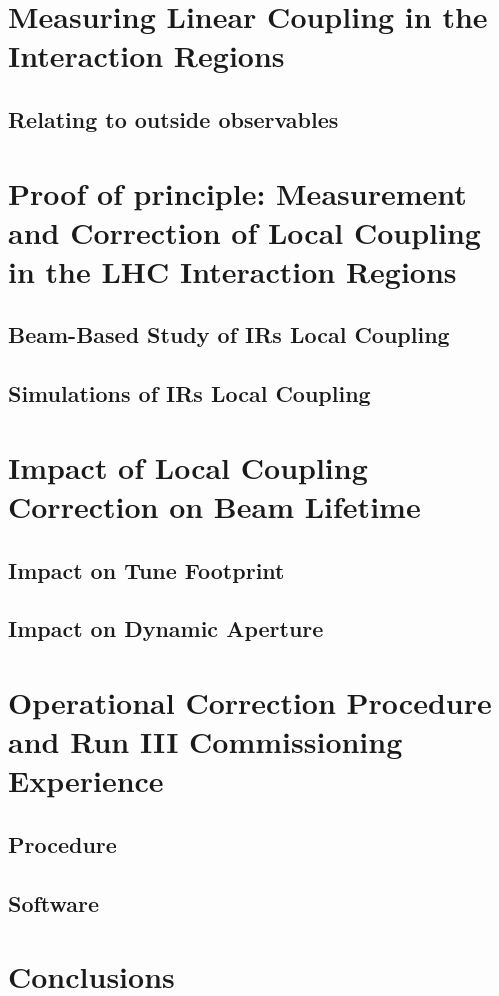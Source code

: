 \section{Measuring Linear Coupling in the Interaction Regions}

\subsection{Relating to outside observables}


\section{Proof of principle: Measurement and Correction of Local Coupling in the LHC Interaction Regions}

\subsection{Beam-Based Study of IRs Local Coupling}

\subsection{Simulations of IRs Local Coupling}


\section{Impact of Local Coupling Correction on Beam Lifetime}

\subsection{Impact on Tune Footprint}

\subsection{Impact on Dynamic Aperture}


\section{Operational Correction Procedure and Run III Commissioning Experience}

\subsection{Procedure}

\subsection{Software}


\section{Conclusions}

